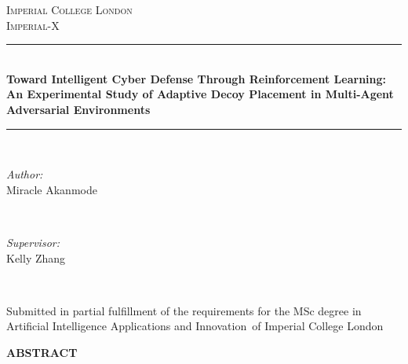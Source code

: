 \documentclass[12pt]{article}
\newcommand{\reporttitle}{Toward Intelligent Cyber Defense Through Reinforcement Learning: An Experimental Study of Adaptive Decoy Placement in Multi-Agent Adversarial Environments}
\newcommand{\thesisauthor}{Miracle Akanmode}
\newcommand{\supervisor}{Kelly Zhang}
\newcommand{\degreetype}{Artificial Intelligence Applications and Innovation}
\theoremstyle{definition}
\theoremstyle{plain}
\begin{document}
\begin{titlepage}

\newcommand{\HRule}{\rule{\linewidth}{0.5mm}} %


\center

\textsc{\Large Imperial College London}\\[0.5cm]
\textsc{\large Imperial-X}\\[0.5cm]

\HRule \\[0.4cm]
{ \huge \bfseries \reporttitle}\\
\HRule \\[1.5cm]

\begin{minipage}{0.4\textwidth}
\begin{flushleft} \large
\emph{Author:}\\
\thesisauthor
\end{flushleft}
\end{minipage}
~
\begin{minipage}{0.4\textwidth}
\begin{flushright} \large
\emph{Supervisor:} \\
\supervisor
\end{flushright}
\end{minipage}\\[4cm]

\vfill

{\large Submitted in partial fulfillment of the requirements for the MSc degree in\\
\degreetype~of Imperial College London}\\[1cm]

\makeatletter
\@date
\makeatother

\end{titlepage}


\tableofcontents
\clearpage  %

\begin{center}
\large\textbf{ABSTRACT}
\end{center}
\end{document}
